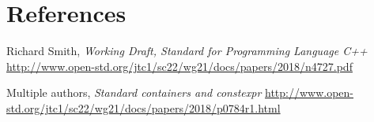 \documentclass{wg21}
\begin{document}
\section{References}
\renewcommand{\section}[2]{}%
\begin{thebibliography}{9}

  Richard Smith,
  \emph{Working Draft, Standard for Programming Language C++}\newline
  \url{http://www.open-std.org/jtc1/sc22/wg21/docs/papers/2018/n4727.pdf}

  Multiple authors,
  \emph{Standard containers and constexpr}\newline
  \url{http://www.open-std.org/jtc1/sc22/wg21/docs/papers/2018/p0784r1.html}

\end{thebibliography}
\end{document}
